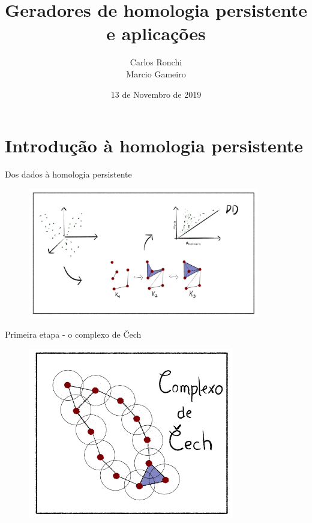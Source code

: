 \documentclass[10pt]{beamer}
\title{Geradores de homologia persistente e aplicações}
\date{13 de Novembro de 2019}
\author{Carlos Ronchi \\
        Marcio Gameiro}
\institute{Universidade de São Paulo}
\begin{document}
\maketitle

\begin{frame}
    \tableofcontents 
\end{frame}

\section{Introdução à homologia persistente}

\begin{frame}{Dos dados à homologia persistente}
    \begin{figure}
        \centering
        \includegraphics[width=0.9\textwidth]{images/StepsHomPers.png}
    \end{figure}
\end{frame}

\begin{frame}{Primeira etapa - o complexo de \v{C}ech}
    \begin{figure}
        \centering
        \includegraphics[width=0.8\textwidth]{../images/ComplexCech.png}
    \end{figure}   
\end{frame}
\end{document}
